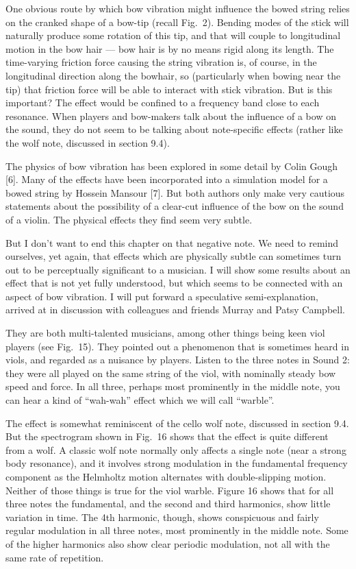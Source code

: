   One obvious route by which bow vibration might influence the bowed string 
  relies on the cranked shape of a bow-tip (recall Fig.\ 2). Bending modes of 
  the stick will naturally produce some rotation of this tip, and that will 
  couple to longitudinal motion in the bow hair — bow hair is by no means rigid 
  along its length. The time-varying friction force causing the string 
  vibration is, of course, in the longitudinal direction along the bowhair, so 
  (particularly when bowing near the tip) that friction force will be able to 
  interact with stick vibration. But is this important? The effect would be 
  confined to a frequency band close to each resonance. When players and 
  bow-makers talk about the influence of a bow on the sound, they do not seem 
  to be talking about note-specific effects (rather like the wolf note, 
  discussed in section 9.4). 

  The physics of bow vibration has been explored in some detail by Colin Gough 
  [6]. Many of the effects have been incorporated into a simulation model for a 
  bowed string by Hossein Mansour [7]. But both authors only make very cautious 
  statements about the possibility of a clear-cut influence of the bow on the 
  sound of a violin. The physical effects they find seem very subtle. 

  But I don’t want to end this chapter on that negative note. We need to remind 
  ourselves, yet again, that effects which are physically subtle can sometimes 
  turn out to be perceptually significant to a musician. I will show some 
  results about an effect that is not yet fully understood, but which seems to 
  be connected with an aspect of bow vibration. I will put forward a 
  speculative semi-explanation, arrived at in discussion with colleagues and 
  friends Murray and Patsy Campbell. 

  They are both multi-talented musicians, among other things being keen viol 
  players (see Fig.\ 15). They pointed out a phenomenon that is sometimes heard 
  in viols, and regarded as a nuisance by players. Listen to the three notes in 
  Sound 2: they were all played on the same string of the viol, with nominally 
  steady bow speed and force. In all three, perhaps most prominently in the 
  middle note, you can hear a kind of “wah-wah” effect which we will call 
  “warble”. 

  The effect is somewhat reminiscent of the cello wolf note, discussed in 
  section 9.4. But the spectrogram shown in Fig.\ 16 shows that the effect is 
  quite different from a wolf. A classic wolf note normally only affects a 
  single note (near a strong body resonance), and it involves strong modulation 
  in the fundamental frequency component as the Helmholtz motion alternates 
  with double-slipping motion. Neither of those things is true for the viol 
  warble. Figure 16 shows that for all three notes the fundamental, and the 
  second and third harmonics, show little variation in time. The 4th harmonic, 
  though, shows conspicuous and fairly regular modulation in all three notes, 
  most prominently in the middle note. Some of the higher harmonics also show 
  clear periodic modulation, not all with the same rate of repetition. 

